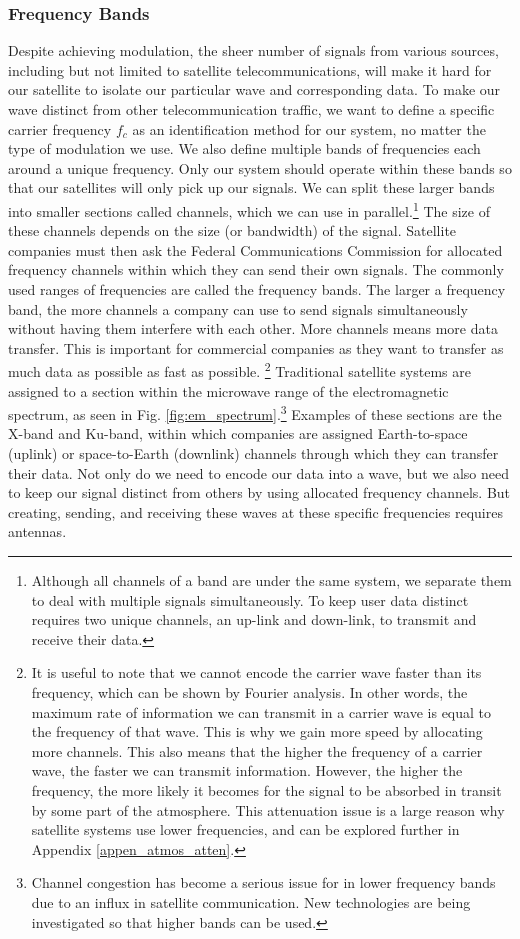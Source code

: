 \documentclass[10pt]{article}
\begin{document}
\subsubsection{Frequency Bands}
\label{band}

Despite achieving modulation, the sheer number of signals from various sources, including but not limited to satellite telecommunications, will make it hard for our satellite to isolate our particular wave and corresponding data. To make our wave distinct from other telecommunication traffic, we want to define a specific carrier frequency $f_c$ as an identification method for our system, no matter the type of modulation we use. We also define multiple bands of frequencies each around a unique frequency. Only our system should operate within these bands so that our satellites will only pick up our signals. We can split these larger bands into smaller sections called channels, which we can use in parallel.\footnote{Although all channels of a band are under the same system, we separate them to deal with multiple signals simultaneously. To keep user data distinct requires two unique channels, an up-link and down-link, to transmit and receive their data.} The size of these channels depends on the size (or bandwidth) of the signal. Satellite companies must then ask the Federal Communications Commission for allocated frequency channels within which they can send their own signals. The commonly used ranges of frequencies are called the frequency bands. The larger a frequency band, the more channels a company can use to send signals simultaneously without having them interfere with each other. More channels means more data transfer. This is important for commercial companies as they want to transfer as much data as possible as fast as possible. \footnote{It is useful to note that we cannot encode the carrier wave faster than its frequency, which can be shown by Fourier analysis. In other words, the maximum rate of information we can transmit in a carrier wave is equal to the frequency of that wave. This is why we gain more speed by allocating more channels. This also means that the higher the frequency of a carrier wave, the faster we can transmit information. However, the higher the frequency, the more likely it becomes for the signal to be absorbed in transit by some part of the atmosphere. This attenuation issue is a large reason why satellite systems use lower frequencies, and can be explored further in Appendix \ref{appen_atmos_atten}.} Traditional satellite systems are assigned to a section within the microwave range of the electromagnetic spectrum, as seen in Fig. \ref{fig:em_spectrum}.\footnote{Channel congestion has become a serious issue for in lower frequency bands due to an influx in satellite communication. New technologies are being investigated so that higher bands can be used\cite{freq_bands}.} Examples of these sections are the X-band and Ku-band, within which companies are assigned Earth-to-space (uplink) or space-to-Earth (downlink) channels through which they can transfer their data. Not only do we need to encode our data into a wave, but we also need to keep our signal distinct from others by using allocated frequency channels. But creating, sending, and receiving these waves at these specific frequencies requires antennas.
\end{document}
